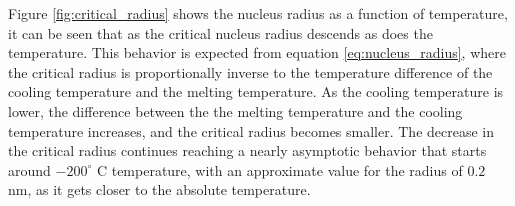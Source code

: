 Figure \ref{fig:critical_radius} shows the nucleus radius as a function of temperature, it can be seen that as the critical nucleus radius descends as does the temperature. This behavior is expected from equation \ref{eq:nucleus_radius}, where the critical radius is proportionally inverse to the temperature difference of the cooling temperature and the melting temperature. As the cooling temperature is lower, the difference between the the melting temperature and the cooling temperature increases, and the critical radius becomes smaller.
The decrease in the critical radius continues reaching a nearly asymptotic behavior that starts around $-200^{\circ}$ C  temperature, with an approximate value for the radius of $0.2$ nm, as it gets closer to the absolute temperature. 

